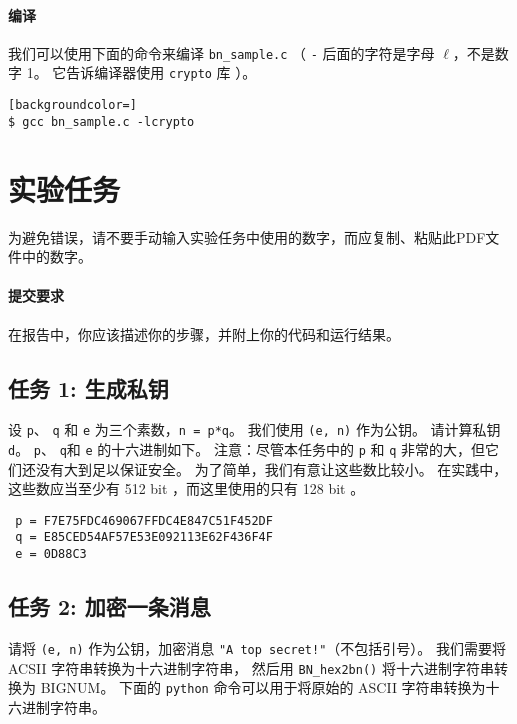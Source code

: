 \paragraph{编译}
我们可以使用下面的命令来编译 \texttt{bn\_sample.c}
（
\texttt{-} 后面的字符是字母 $\ell$，不是数字 1。
它告诉编译器使用 \texttt{crypto} 库
）。

\begin{lstlisting}[backgroundcolor=]
$ gcc bn_sample.c -lcrypto
\end{lstlisting}



\section{实验任务}


为避免错误，请不要手动输入实验任务中使用的数字，而应复制、粘贴此PDF文件中的数字。


\paragraph{提交要求}
在报告中，你应该描述你的步骤，并附上你的代码和运行结果。


\subsection{任务 1: 生成私钥}

设 \texttt{p}、 \texttt{q} 和 \texttt{e} 为三个素数，\texttt{n = p*q}。
我们使用 \texttt{(e, n)} 作为公钥。
请计算私钥 \texttt{d}。
\texttt{p}、 \texttt{q}和 \texttt{e} 的十六进制如下。
注意：尽管本任务中的 \texttt{p} 和 \texttt{q} 非常的大，但它们还没有大到足以保证安全。
为了简单，我们有意让这些数比较小。
在实践中，这些数应当至少有 512 bit ，而这里使用的只有 128 bit 。

\begin{lstlisting}
 p = F7E75FDC469067FFDC4E847C51F452DF
 q = E85CED54AF57E53E092113E62F436F4F
 e = 0D88C3
\end{lstlisting}


\subsection{任务 2: 加密一条消息}

请将 \texttt{(e, n)} 作为公钥，加密消息 \texttt{"A top secret!"}（不包括引号）。
我们需要将 ACSII 字符串转换为十六进制字符串，
然后用 \texttt{BN\_hex2bn()} 将十六进制字符串转换为 BIGNUM。
下面的 \texttt{python} 命令可以用于将原始的 ASCII 字符串转换为十六进制字符串。


